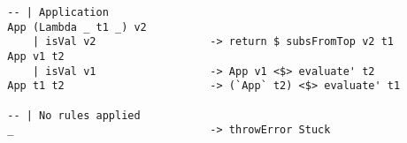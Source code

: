 \begin{lstlisting}
        -- | Application
        App (Lambda _ t1 _) v2 
            | isVal v2                  -> return $ subsFromTop v2 t1          
        App v1 t2 
            | isVal v1                  -> App v1 <$> evaluate' t2
        App t1 t2                       -> (`App` t2) <$> evaluate' t1                        
                        
        -- | No rules applied
        _                               -> throwError Stuck              
\end{lstlisting}